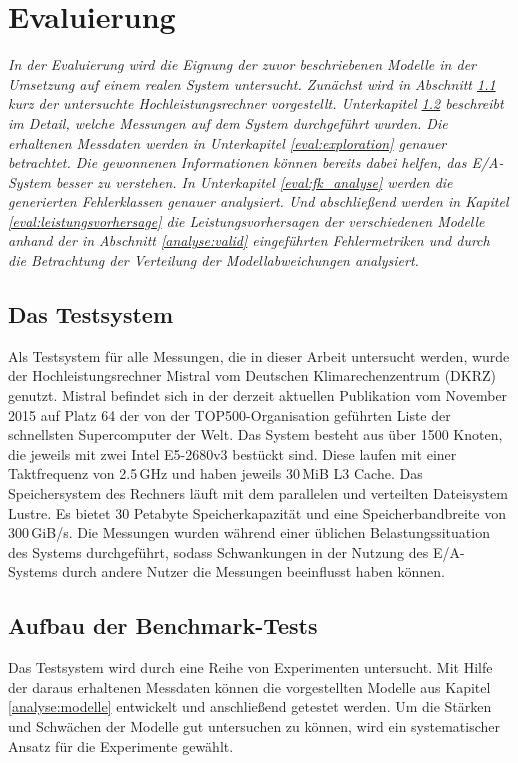 \documentclass[
	twoside,
	12pt,
	a4paper,
	BCOR10mm,
	DIV14,
	listof=totoc,
	bibliography=totoc,
	headsepline
]{scrreprt}
\begin{document}
\chapter{Evaluierung}
\label{eval}
\textit{%
	In der Evaluierung wird die Eignung der zuvor beschriebenen Modelle in der Umsetzung auf einem realen System untersucht.
	Zunächst wird in Abschnitt \ref{eval:testsystem} kurz der untersuchte Hochleistungsrechner vorgestellt.	
	Unterkapitel \ref{eval:benchmark} beschreibt im Detail, welche Messungen auf dem System durchgeführt wurden.
	Die erhaltenen Messdaten werden in Unterkapitel \ref{eval:exploration} genauer betrachtet. Die gewonnenen Informationen können bereits dabei helfen, das E/A-System besser zu verstehen.
	In Unterkapitel \ref{eval:fk_analyse} werden die generierten Fehlerklassen genauer analysiert.
	Und abschließend werden in Kapitel \ref{eval:leistungsvorhersage} die Leistungsvorhersagen der verschiedenen Modelle anhand der in Abschnitt \ref{analyse:valid} eingeführten Fehlermetriken und durch die Betrachtung der Verteilung der Modellabweichungen analysiert.
}
\bigskip

\section{Das Testsystem}
\label{eval:testsystem}
Als Testsystem für alle Messungen, die in dieser Arbeit untersucht werden, wurde der Hochleistungsrechner Mistral vom Deutschen Klimarechenzentrum (DKRZ) genutzt.
Mistral befindet sich in der derzeit aktuellen Publikation vom November 2015 auf Platz 64 der von der TOP500-Organisation geführten Liste der schnellsten Supercomputer der Welt.
Das System besteht aus über 1500 Knoten, die jeweils mit zwei Intel E5-2680v3 bestückt sind. Diese laufen mit einer Taktfrequenz von 2.5\,GHz und haben jeweils 30\,MiB L3 Cache.
Das Speichersystem des Rechners läuft mit dem parallelen und verteilten Dateisystem Lustre.
Es bietet 30 Petabyte Speicherkapazität und eine Speicherbandbreite von 300\,GiB/s. Die Messungen wurden während einer üblichen Belastungssituation des Systems durchgeführt, sodass Schwankungen in der Nutzung des E/A-Systems durch andere Nutzer die Messungen beeinflusst haben können.

\section{Aufbau der Benchmark-Tests}
\label{eval:benchmark}
Das Testsystem wird durch eine Reihe von Experimenten untersucht.
Mit Hilfe der daraus erhaltenen Messdaten können die vorgestellten Modelle aus Kapitel \ref{analyse:modelle} entwickelt und anschließend getestet werden.
Um die Stärken und Schwächen der Modelle gut untersuchen zu können, wird ein systematischer Ansatz für die Experimente gewählt.\medskip
\end{document}
